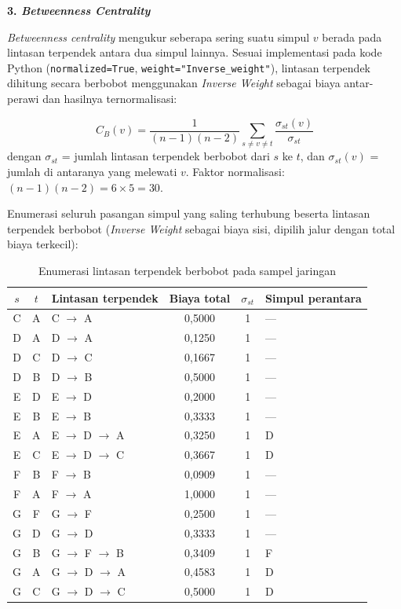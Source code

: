 \vspace{0.3cm}
\noindent\textbf{3. \textit{Betweenness Centrality}}

\vspace{0.2cm}
\begin{sloppypar}
\noindent \textit{Betweenness centrality} mengukur seberapa sering suatu simpul $v$ berada pada lintasan terpendek antara dua simpul lainnya. Sesuai implementasi pada kode Python (\allowbreak\texttt{normalized=True}, \texttt{weight="Inverse\_}\allowbreak\texttt{weight"}), lintasan terpendek dihitung secara berbobot menggunakan \textit{Inverse Weight} sebagai biaya antar-perawi dan hasilnya ternormalisasi:
\end{sloppypar}
$$C_B(v) = \frac{1}{(n-1)(n-2)} \sum_{s \neq v \neq t} \frac{\sigma_{st}(v)}{\sigma_{st}}$$
dengan $\sigma_{st}$ = jumlah lintasan terpendek berbobot dari $s$ ke $t$, dan $\sigma_{st}(v)$ = jumlah di antaranya yang melewati $v$. Faktor normalisasi: $(n-1)(n-2) = 6 \times 5 = 30$.

\begin{sloppypar}
\noindent Enumerasi seluruh pasangan simpul yang saling terhubung beserta lintasan terpendek berbobot (\textit{Inverse Weight} sebagai biaya sisi, dipilih jalur dengan total biaya terkecil):
\end{sloppypar}

\begin{table}[H]
\centering
\caption{Enumerasi lintasan terpendek berbobot pada sampel jaringan}
\label{lamp:tab:paths}
\begin{tabular}{|c|c|l|c|c|l|}
\hline
$s$ & $t$ & \textbf{Lintasan terpendek} & \textbf{Biaya total} & $\sigma_{st}$ & \textbf{Simpul perantara} \\
\hline
C & A & C $\to$ A              & 0,5000 & 1 & --- \\
D & A & D $\to$ A              & 0,1250 & 1 & --- \\
D & C & D $\to$ C              & 0,1667 & 1 & --- \\
D & B & D $\to$ B              & 0,5000 & 1 & --- \\
E & D & E $\to$ D              & 0,2000 & 1 & --- \\
E & B & E $\to$ B              & 0,3333 & 1 & --- \\
E & A & E $\to$ D $\to$ A      & 0,3250 & 1 & D \\
E & C & E $\to$ D $\to$ C      & 0,3667 & 1 & D \\
F & B & F $\to$ B              & 0,0909 & 1 & --- \\
F & A & F $\to$ A              & 1,0000 & 1 & --- \\
G & F & G $\to$ F              & 0,2500 & 1 & --- \\
G & D & G $\to$ D              & 0,3333 & 1 & --- \\
G & B & G $\to$ F $\to$ B      & 0,3409 & 1 & F \\
G & A & G $\to$ D $\to$ A      & 0,4583 & 1 & D \\
G & C & G $\to$ D $\to$ C      & 0,5000 & 1 & D \\
\hline
\end{tabular}
\end{table}

